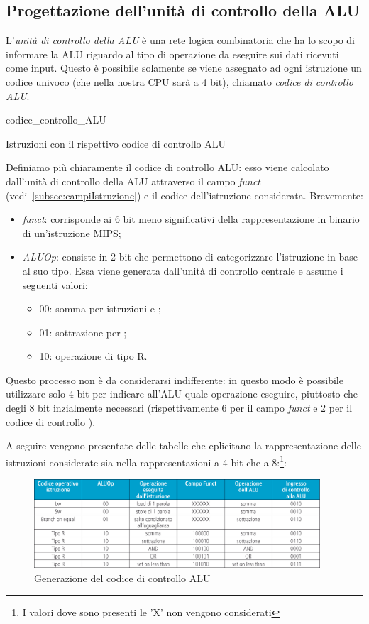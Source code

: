\documentclass[class=book, crop=false, oneside]{standalone}
\begin{document}
\subsection{Progettazione dell'unità di controllo della ALU}
L'\emph{unità di controllo della ALU} è una rete logica combinatoria che ha lo scopo di informare la ALU riguardo al tipo di operazione da eseguire sui dati ricevuti come input. Questo è possibile solamente se viene assegnato ad ogni istruzione un codice univoco (che nella nostra CPU sarà a 4 bit), chiamato \emph{codice di controllo ALU}.

\begin{table}[!h]
	\centering
	{codice_controllo_ALU}
	\caption{Istruzioni con il rispettivo codice di controllo ALU}
\end{table}
Definiamo più chiaramente il codice di controllo ALU: esso viene calcolato dall'unità di controllo della ALU attraverso il campo \emph{funct} (vedi~\ref{subsec:campiIstruzione}) e il codice  dell'istruzione considerata. Brevemente:
\begin{itemize}
	\item \emph{funct}: corrisponde ai 6 bit meno significativi della rappresentazione in binario di un'istruzione MIPS;
	\item \emph{ALUOp}: consiste in 2 bit che permettono di categorizzare l'istruzione in base al suo tipo. Essa viene generata dall'unità di controllo centrale e assume i seguenti valori:
	\begin{itemize}
		\item 00: somma per istruzioni  e ;
		\item 01: sottrazione per ;
		\item 10: operazione di tipo R.
	\end{itemize}
\end{itemize}
Questo processo non è da considerarsi indifferente: in questo modo è possibile utilizzare solo 4 bit per indicare all'ALU quale operazione eseguire, piuttosto che degli 8 bit inzialmente necessari (rispettivamente 6 per il campo \emph{funct} e 2 per il codice di controllo ).

A seguire vengono presentate delle tabelle che eplicitano la rappresentazione delle istruzioni considerate sia nella rappresentazioni a 4 bit che a 8:\footnote{I valori dove sono presenti le 'X' non vengono considerati}:

\begin{figure}[H]
	\centering
	\includegraphics[width=0.95\textwidth,keepaspectratio]{riassunto_controllo_ALU.png}
	\caption{Generazione del codice di controllo ALU}
\end{figure}
\end{document}
